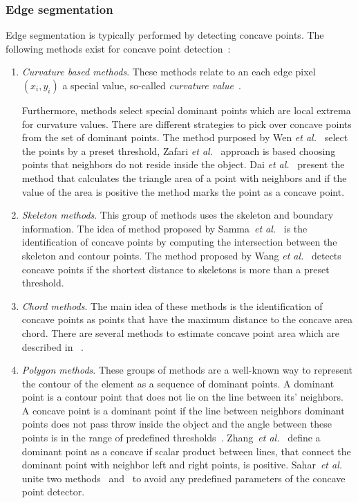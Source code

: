 \documentclass{lutmscthesis}[2010/09/22]
\begin{document}
\subsubsection{Edge segmentation}
Edge segmentation is typically performed by detecting concave points.
The following methods exist for concave point detection~\cite{compare-cpd}:
\begin{enumerate}
    \item 
    \textit{Curvature based methods}. 
    These methods relate to an each edge pixel $(x_i,y_i)$ a special value, so-called \textit{curvature value}~\cite{Zafari15}.
    
    
    Furthermore, methods select special dominant points which are local extrema for curvature values. There are different strategies to pick over concave points from the set of dominant points. The method purposed by Wen \emph{et al.}~\cite{curv-wen}  select the points by a preset threshold, Zafari \emph{et al.}~\cite{Zafari15} approach is based choosing points that neighbors do not reside inside the object. Dai \emph{et al.}~\cite{curv-dai} present the method that calculates the triangle area of a point with neighbors and if the value of the area is positive the method marks the point as a concave point.
   
    \item 
    \textit{Skeleton methods}. This group of methods uses the skeleton and boundary information. The idea of method proposed by Samma~\emph{et al.}~\cite{bnd-skeleton} is the identification of concave points by computing the intersection between the skeleton and contour points. The method proposed by Wang \emph{et al.}~\cite{skeleton} detects concave points if the shortest distance to skeletons is more than a preset threshold.
    \item 
    \textit{Chord methods}. The main idea of these methods is the identification of concave points as points that have the maximum distance to the concave area chord. There are several methods to estimate concave point area which are described in 
    ~\cite{chord-farhan,chord-kumar}.
    
    \item 
    \textit{Polygon methods}. These groups of methods are a well-known way to represent the contour of the element as a sequence of dominant points. A dominant point is a contour point that does not lie on the line between its' neighbors. A concave point is a dominant point if the line between neighbors dominant points does not pass throw inside the object and the angle between these points is in the range of predefined thresholds~\cite{Bai20092434}. Zhang~\emph{et al.}~\cite{bubble} define a dominant point as a concave if scalar product between lines, that connect the dominant point with neighbor left and right points, is positive. Sahar~\emph{et al.}~\cite{compare-cpd} unite two methods~\cite{bubble} and~\cite{Bai20092434} to avoid any predefined parameters of the concave point detector.
\end{enumerate}
\end{document}
